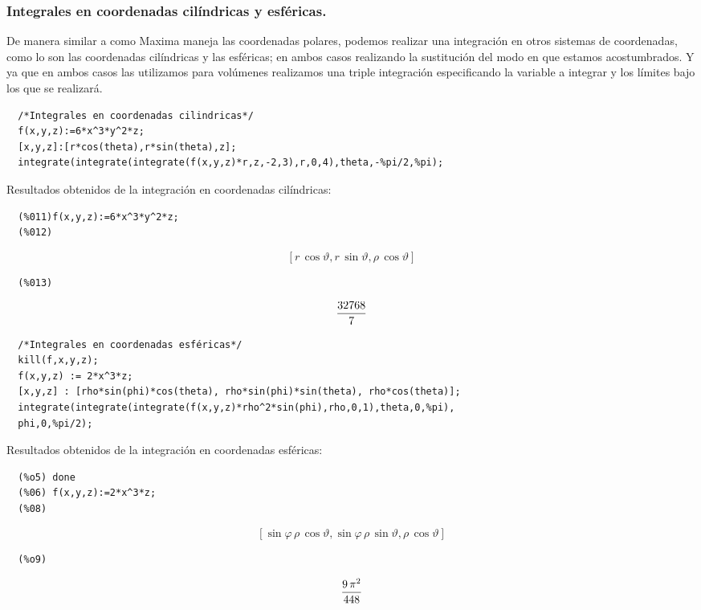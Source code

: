 \documentclass[12pt]{article}
\begin{document}
  \subsubsection*{Integrales en coordenadas cilíndricas y esféricas.}
  
  De manera similar a como Maxima maneja las coordenadas polares, podemos realizar una integración en otros sistemas de coordenadas, como lo son las coordenadas cilíndricas y las esféricas; en ambos casos realizando la sustitución del modo en que estamos acostumbrados. Y ya que en ambos casos las utilizamos para volúmenes realizamos una triple integración especificando la variable a integrar y los límites bajo los que se realizará.
  
  \begin{verbatim}
  /*Integrales en coordenadas cilindricas*/
  f(x,y,z):=6*x^3*y^2*z;
  [x,y,z]:[r*cos(theta),r*sin(theta),z];
  integrate(integrate(integrate(f(x,y,z)*r,z,-2,3),r,0,4),theta,-%pi/2,%pi);
  \end{verbatim}
  
  Resultados obtenidos de la integración en coordenadas cilíndricas:
  
  \begin{verbatim}
  (%011)f(x,y,z):=6*x^3*y^2*z;
  (%012)
  \end{verbatim}
  $$\left[ r\,\cos \vartheta , r\,\sin \vartheta , \rho\,\cos \vartheta
    \right] $$
  \begin{verbatim}
  (%013)
  \end{verbatim}
  $${{32768}\over{7}}$$
  
 
  
  \begin{verbatim}
  /*Integrales en coordenadas esféricas*/
  kill(f,x,y,z);
  f(x,y,z) := 2*x^3*z;
  [x,y,z] : [rho*sin(phi)*cos(theta), rho*sin(phi)*sin(theta), rho*cos(theta)];
  integrate(integrate(integrate(f(x,y,z)*rho^2*sin(phi),rho,0,1),theta,0,%pi),
  phi,0,%pi/2);
  \end{verbatim}
  
  Resultados obtenidos de la integración en coordenadas esféricas:
  \begin{verbatim}
  (%o5) done
  (%06) f(x,y,z):=2*x^3*z;
  (%08)
  \end{verbatim}
  $$\left[ \sin \varphi\,\rho\,\cos \vartheta , \sin \varphi\,\rho\,
   \sin \vartheta , \rho\,\cos \vartheta \right] $$
  \begin{verbatim}
  (%o9)
  \end{verbatim} 
  $${{9\,\pi^2}\over{448}}$$
  \pagebreak
\end{document}
